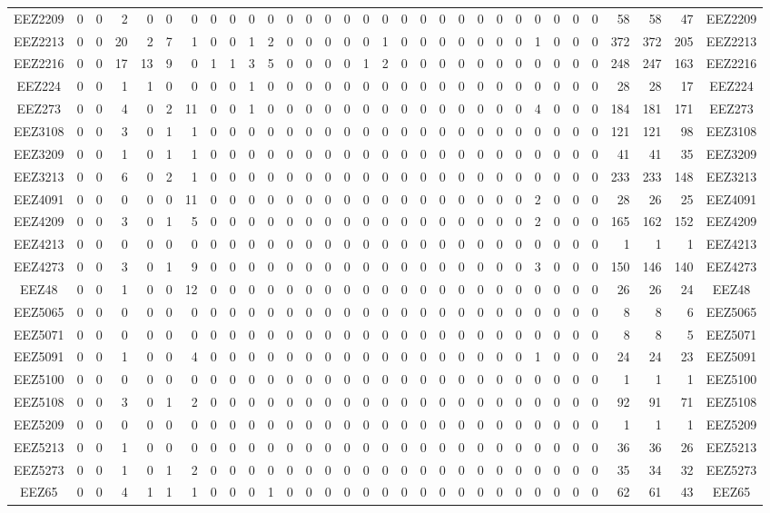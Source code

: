 \documentclass[10pt,a4paper,twoside]{report}
\begin{document}
{\begin{tabular}{crrrrrrrrrrrrrrrrrrrrrrrrrrrrrrc}
EEZ2209&0&0&2&0&0&0&0&0&0&0&0&0&0&0&0&0&0&0&0&0&0&0&0&0&0&0&0&58&58&47&EEZ2209\\
EEZ2213&0&0&20&2&7&1&0&0&1&2&0&0&0&0&0&1&0&0&0&0&0&0&0&1&0&0&0&372&372&205&EEZ2213\\
EEZ2216&0&0&17&13&9&0&1&1&3&5&0&0&0&0&1&2&0&0&0&0&0&0&0&0&0&0&0&248&247&163&EEZ2216\\
EEZ224&0&0&1&1&0&0&0&0&1&0&0&0&0&0&0&0&0&0&0&0&0&0&0&0&0&0&0&28&28&17&EEZ224\\
EEZ273&0&0&4&0&2&11&0&0&1&0&0&0&0&0&0&0&0&0&0&0&0&0&0&4&0&0&0&184&181&171&EEZ273\\
EEZ3108&0&0&3&0&1&1&0&0&0&0&0&0&0&0&0&0&0&0&0&0&0&0&0&0&0&0&0&121&121&98&EEZ3108\\
EEZ3209&0&0&1&0&1&1&0&0&0&0&0&0&0&0&0&0&0&0&0&0&0&0&0&0&0&0&0&41&41&35&EEZ3209\\
EEZ3213&0&0&6&0&2&1&0&0&0&0&0&0&0&0&0&0&0&0&0&0&0&0&0&0&0&0&0&233&233&148&EEZ3213\\
EEZ4091&0&0&0&0&0&11&0&0&0&0&0&0&0&0&0&0&0&0&0&0&0&0&0&2&0&0&0&28&26&25&EEZ4091\\
EEZ4209&0&0&3&0&1&5&0&0&0&0&0&0&0&0&0&0&0&0&0&0&0&0&0&2&0&0&0&165&162&152&EEZ4209\\
EEZ4213&0&0&0&0&0&0&0&0&0&0&0&0&0&0&0&0&0&0&0&0&0&0&0&0&0&0&0&1&1&1&EEZ4213\\
EEZ4273&0&0&3&0&1&9&0&0&0&0&0&0&0&0&0&0&0&0&0&0&0&0&0&3&0&0&0&150&146&140&EEZ4273\\
EEZ48&0&0&1&0&0&12&0&0&0&0&0&0&0&0&0&0&0&0&0&0&0&0&0&0&0&0&0&26&26&24&EEZ48\\
EEZ5065&0&0&0&0&0&0&0&0&0&0&0&0&0&0&0&0&0&0&0&0&0&0&0&0&0&0&0&8&8&6&EEZ5065\\
EEZ5071&0&0&0&0&0&0&0&0&0&0&0&0&0&0&0&0&0&0&0&0&0&0&0&0&0&0&0&8&8&5&EEZ5071\\
EEZ5091&0&0&1&0&0&4&0&0&0&0&0&0&0&0&0&0&0&0&0&0&0&0&0&1&0&0&0&24&24&23&EEZ5091\\
EEZ5100&0&0&0&0&0&0&0&0&0&0&0&0&0&0&0&0&0&0&0&0&0&0&0&0&0&0&0&1&1&1&EEZ5100\\
EEZ5108&0&0&3&0&1&2&0&0&0&0&0&0&0&0&0&0&0&0&0&0&0&0&0&0&0&0&0&92&91&71&EEZ5108\\
EEZ5209&0&0&0&0&0&0&0&0&0&0&0&0&0&0&0&0&0&0&0&0&0&0&0&0&0&0&0&1&1&1&EEZ5209\\
EEZ5213&0&0&1&0&0&0&0&0&0&0&0&0&0&0&0&0&0&0&0&0&0&0&0&0&0&0&0&36&36&26&EEZ5213\\
EEZ5273&0&0&1&0&1&2&0&0&0&0&0&0&0&0&0&0&0&0&0&0&0&0&0&0&0&0&0&35&34&32&EEZ5273\\
EEZ65&0&0&4&1&1&1&0&0&0&1&0&0&0&0&0&0&0&0&0&0&0&0&0&0&0&0&0&62&61&43&EEZ65\\

\end{tabular}}
\end{document}

